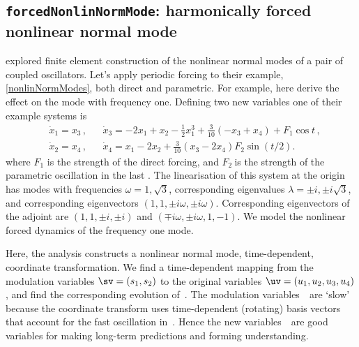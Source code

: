 \subsection{\texttt{forcedNonlinNormMode}: harmonically forced nonlinear normal mode} 
\label{forcedNonlinNormMode}
\localtableofcontents

\cite{Renson2012}  explored finite element construction of
the nonlinear normal modes of a pair of coupled oscillators.
Let's apply periodic forcing to their example,
\cref{nonlinNormModes}, both direct and parametric. For
example, here derive the effect on the mode with frequency
one. Defining two new variables one of their example systems
is
\begin{align*}
&\dot x_1=x_3\,,
&&\dot x_3=-2x_1+x_2-\frac12x_1^3+\frac3{10}(-x_3+x_4)+F_1\cos t\,,
\\&\dot x_2=x_4\,,
&&\dot x_4=x_1-2x_2+\frac3{10}(x_3-2x_4)F_2\sin(t/2).
\end{align*}
where \(F_1\) is the strength of the direct forcing, and
\(F_2~\)is the strength of the parametric oscillation in the
last \ode.  The linearisation of this system at the origin
has modes with frequencies \(\omega=1,\sqrt3\),
corresponding eigenvalues \(\lambda=\pm i,\pm i\sqrt3\), and
corresponding eigenvectors \((1,1,\pm i\omega,\pm
i\omega)\).  Corresponding  eigenvectors of the adjoint are
\((1,1,\pm i,\pm i)\) and \((\mp i\omega,\pm
i\omega,1,-1)\).   We model the nonlinear forced dynamics of
the frequency one mode.

Here, the analysis constructs a nonlinear normal mode,
time-dependent, coordinate transformation. We find a
time-dependent mapping from the modulation variables
\(\sv=(s_1,s_2)\) to the original variables
\(\uv=(u_1,u_2,u_3,u_4)\), and find the corresponding
evolution of~\sv. The modulation variables~\sv\ are `slow'
because the coordinate transform uses time-dependent
(rotating) basis vectors that account for the fast
oscillation in~\uv. Hence the new variables~\sv\ are good
variables for making long-term predictions and forming
understanding.


